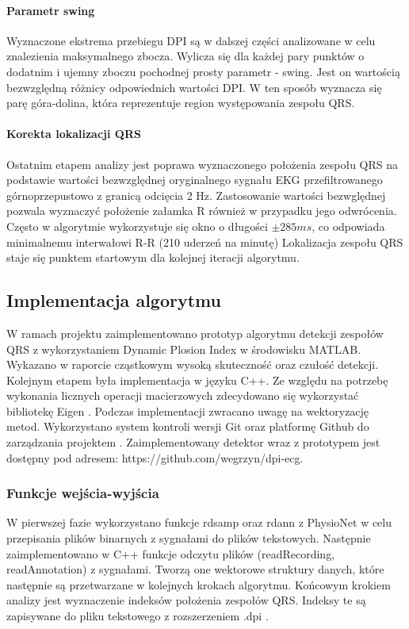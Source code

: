 \documentclass[a4paper,10pt]{article} %
\begin{document}
\paragraph{Parametr swing}
Wyznaczone ekstrema przebiegu DPI są w dalszej części analizowane w celu znalezienia maksymalnego zbocza. Wylicza się dla każdej pary punktów o dodatnim i ujemny zboczu pochodnej prosty parametr - swing. Jest on wartością bezwzględną różnicy odpowiednich wartości DPI. W ten sposób wyznacza się parę góra-dolina, która reprezentuje region występowania zespołu QRS.
\paragraph{Korekta lokalizacji QRS}
Ostatnim etapem analizy jest poprawa wyznaczonego położenia zespołu QRS na podstawie wartości bezwzględnej oryginalnego sygnału EKG przefiltrowanego górnoprzepustowo z granicą odcięcia 2 Hz. Zastosowanie wartości bezwględnej pozwala wyznaczyć położenie załamka R również w przypadku jego odwrócenia. Często w algorytmie wykorzystuje się okno o długości $\pm 285ms$, co odpowiada minimalnemu interwałowi R-R (210 uderzeń na minutę) 
Lokalizacja zespołu QRS staje się punktem startowym dla kolejnej iteracji algorytmu.

\subsection{Implementacja algorytmu}
W ramach projektu zaimplementowano prototyp algorytmu detekcji zespołów QRS z wykorzystaniem Dynamic Plosion Index w środowisku MATLAB. Wykazano w raporcie cząstkowym wysoką skuteczność oraz czułość detekcji. Kolejnym etapem była implementacja w języku C++. Ze względu na potrzebę wykonania licznych operacji macierzowych zdecydowano się wykorzystać bibliotekę Eigen \cite{eigenweb}. Podczas implementacji zwracano uwagę na wektoryzację metod. Wykorzystano system kontroli wersji Git oraz platformę Github do zarządzania projektem \cite{dpi_ecg_github}. Zaimplementowany detektor wraz z prototypem jest dostępny pod adresem: https://github.com/wegrzyn/dpi-ecg.

\subsubsection{Funkcje wejścia-wyjścia}
W pierwszej fazie wykorzystano funkcje rdsamp oraz rdann z PhysioNet  w celu przepisania plików binarnych z sygnałami do plików tekstowych. Następnie zaimplementowano w C++ funkcje odczytu plików (readRecording, readAnnotation) z sygnałami. Tworzą one wektorowe struktury danych, które następnie są przetwarzane w kolejnych krokach algorytmu. Końcowym krokiem analizy jest wyznaczenie indeksów położenia zespołów QRS. Indeksy te są zapisywane do pliku tekstowego z rozszerzeniem .dpi . 
 
\end{document}
